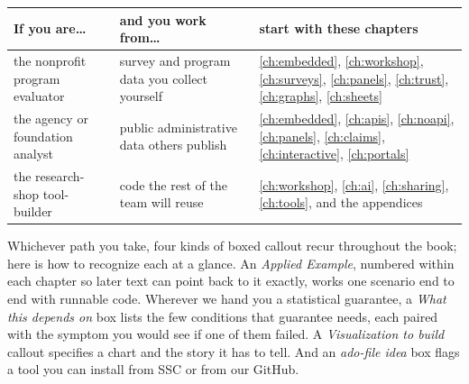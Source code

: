 \begin{table}[htbp]
\centering
\begin{tabular}{@{}p{3.5cm}p{4.6cm}p{5.0cm}@{}}
\toprule
\textbf{If you are\ldots} & \textbf{and you work from\ldots} & \textbf{start with these chapters} \\
\midrule
the nonprofit program evaluator & survey and program data you collect yourself & \ref{ch:embedded}, \ref{ch:workshop}, \ref{ch:surveys}, \ref{ch:panels}, \ref{ch:trust}, \ref{ch:graphs}, \ref{ch:sheets} \\
\addlinespace
the agency or foundation analyst & public administrative data others publish & \ref{ch:embedded}, \ref{ch:apis}, \ref{ch:noapi}, \ref{ch:panels}, \ref{ch:claims}, \ref{ch:interactive}, \ref{ch:portals} \\
\addlinespace
the research-shop tool-builder & code the rest of the team will reuse & \ref{ch:workshop}, \ref{ch:ai}, \ref{ch:sharing}, \ref{ch:tools}, and the appendices \\
\bottomrule
\end{tabular}
\end{table}

\noindent Whichever path you take, four kinds of boxed callout recur throughout the book; here is how to recognize each at a glance. An \emph{Applied Example}, numbered within each chapter so later text can point back to it exactly, works one scenario end to end with runnable code. Wherever we hand you a statistical guarantee, a \emph{What this depends on} box lists the few conditions that guarantee needs, each paired with the symptom you would see if one of them failed. A \emph{Visualization to build} callout specifies a chart and the story it has to tell. And an \emph{ado-file idea} box flags a tool you can install from SSC or from our GitHub.


